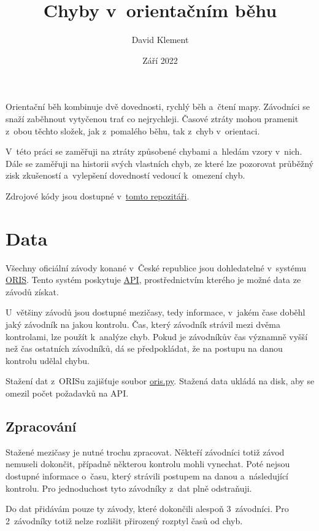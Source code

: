 \documentclass[a4paper,11pt]{article}
\title{\Huge Chyby v~orientačním běhu}
\author{David Klement}
\date{Září 2022}
\begin{document}
\maketitle
\thispagestyle{empty}
\pagebreak

Orientační běh kombinuje dvě dovednosti, rychlý běh a~čtení mapy. Závodníci se
snaží zaběhnout vytyčenou trať co nejrychleji. Časové ztráty mohou pramenit
z~obou těchto složek, jak z~pomalého běhu, tak z~chyb v~orientaci.

V~této práci se zaměřuji na ztráty způsobené chybami a~hledám vzory v~nich. Dále
se zaměřuji na historii svých vlastních chyb, ze které lze pozorovat průběžný
zisk zkušeností a~vylepšení dovedností vedoucí k~omezení chyb.

Zdrojové kódy jsou dostupné
v~\href{https://github.com/kulisak12/mistake-stats}{tomto repozitáři}.

\section*{Data}

Všechny oficiální závody konané v~České republice jsou dohledatelné v~systému
\href{https://oris.orientacnisporty.cz/?sport=1}{ORIS}. Tento systém poskytuje
\href{https://oris.orientacnisporty.cz/API}{API}, prostřednictvím kterého je možné
data ze závodů získat.

U~většiny závodů jsou dostupné mezičasy, tedy informace, v~jakém čase doběhl
jaký závodník na jakou kontrolu. Čas, který závodník strávil mezi dvěma
kontrolami, lze použít k~analýze chyb. Pokud je závodníkův čas významně vyšší
než čas ostatních závodníků, dá se předpokládat, že na postupu na danou kontrolu
udělal chybu.

Stažení dat z~ORISu zajišťuje soubor
\href{https://github.com/kulisak12/mistake-stats/blob/main/oris.py}{oris.py}.
Stažená data ukládá na disk, aby se omezil počet požadavků na API.

\subsection*{Zpracování}

Stažené mezičasy je nutné trochu zpracovat. Někteří závodníci totiž závod
nemuseli dokončit, případně některou kontrolu mohli vynechat. Poté nejsou
dostupné informace o~času, který strávili postupem na danou a~následující
kontrolu. Pro jednoduchost tyto závodníky z~dat plně odstraňuji.

Do dat přidávám pouze ty závody, které dokončili alespoň 3~závodníci. Pro
2~závodníky totiž nelze rozlišit přirozený rozptyl časů od chyb.
\end{document}
